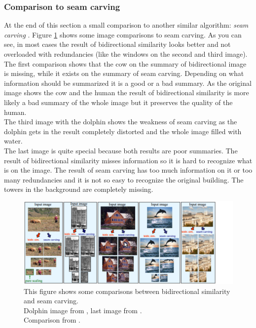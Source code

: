 
\subsubsection*{Comparison to seam carving}
At the end of this section a small comparison to another similar algorithm: \textit{seam carving} \cite{seamcarv}.
Figure \ref{fig:Seam carving} shows some image comparisons to seam carving. As you can see, in most cases the result of bidirectional similarity looks better and not overloaded with redundancies (like the windows on the second and third image).\\
The first comparison shows that the cow on the summary of bidirectional image is missing, while it exists on the summary of seam carving. Depending on what information should be summarized it is a good or a bad summary. As the original image shows the cow and the human the result of bidirectional similarity is more likely a bad summary of the whole image but it preserves the quality of the human.\\
The third image with the dolphin shows the weakness of seam carving as the dolphin gets in the result completely distorted and the whole image filled with water.\\
The last image is quite special because both results are poor summaries. The result of bidirectional similarity misses information so it is hard to recognize what is on the image. The result of seam carving has too much information on it or too many redundancies and it is not so easy to recognize the original building. The towers in the background are completely missing.\\


\begin{figure}[h]
\centering
\includegraphics[scale=0.95]{img/seamcarving}
\caption[Seam carving]{This figure shows some comparisons between bidirectional similarity and seam carving.\\ Dolphin image from \cite{seamcarv}, last image from \cite{wolf}.\\
Comparison from \cite{bisi}.}
\label{fig:Seam carving}
\end{figure}
